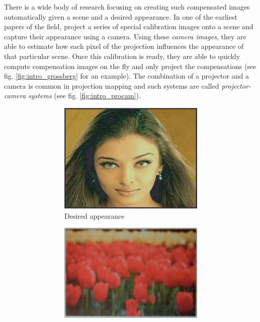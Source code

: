 There is a wide body of research focusing on creating such compensated images automatically given a scene and a desired appearance. In one of the earliest papers of the field, \citet*{Grossberg2004} project a series of special calibration images onto a scene and capture their appearance using a camera. Using these \textit{camera images}, they are able to estimate how each pixel of the projection influences the appearance of that particular scene. Once this calibration is ready, they are able to quickly compute compensation images on the fly and only project the compensations (see fig. \ref{fig:intro_grossberg} for an example). The combination of a projector and a camera is common in projection mapping and such systems are called \textit{projector-camera systems} (see fig. \ref{fig:intro_procam}).

\begin{figure}[ht]
    \centering    
    \begin{subfigure}{0.8\textwidth}
        \centering
        \begin{subfigure}{0.3\textwidth}
            \centering
            \includegraphics[width=\textwidth]{images/01-desired_appearance.png}
            \caption{Desired appearance}
            \label{fig:intro_grossberg-desired_appearance}
        \end{subfigure}
        \hfill
        \begin{subfigure}{0.3\textwidth}
            \centering
            \includegraphics[width=\textwidth]{images/01-background.png}

\end{subfigure}
\end{subfigure}
\end{figure}
